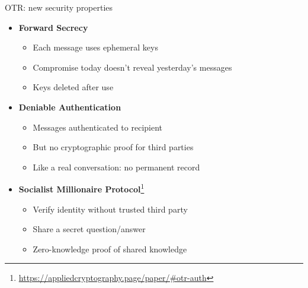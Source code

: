 \ifdefined\PRESENTATION\else\PassOptionsToClass{handout}{beamer}\fi\documentclass[aspectratio=169, lualatex]{beamer}
\begin{document}
\begin{frame}{OTR: new security properties}
	\begin{itemize}
		\item \textbf{Forward Secrecy}
		      \begin{itemize}
			      \item Each message uses ephemeral keys
			      \item Compromise today doesn't reveal yesterday's messages
			      \item Keys deleted after use
		      \end{itemize}
		\item \textbf{Deniable Authentication}
		      \begin{itemize}
			      \item Messages authenticated to recipient
			      \item But no cryptographic proof for third parties
			      \item Like a real conversation: no permanent record
		      \end{itemize}
		\item \textbf{Socialist Millionaire Protocol}\footnote{\url{https://appliedcryptography.page/paper/\#otr-auth}}
		      \begin{itemize}
			      \item Verify identity without trusted third party
			      \item Share a secret question/answer
			      \item Zero-knowledge proof of shared knowledge
		      \end{itemize}
	\end{itemize}
\end{frame}
\end{document}
